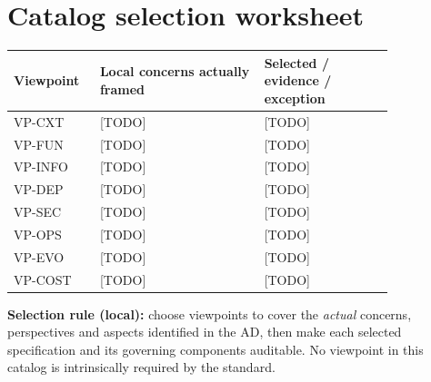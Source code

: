 \documentclass[11pt,letterpaper]{article}
\begin{document}
\section{Catalog selection worksheet}
\begin{longtable}{p{0.15\linewidth}p{0.38\linewidth}p{0.30\linewidth}}\toprule\textbf{Viewpoint}&\textbf{Local concerns actually framed}&\textbf{Selected / evidence / exception}\\\midrule\endhead
VP-CXT&[TODO]&[TODO]\\ VP-FUN&[TODO]&[TODO]\\ VP-INFO&[TODO]&[TODO]\\ VP-DEP&[TODO]&[TODO]\\ VP-SEC&[TODO]&[TODO]\\ VP-OPS&[TODO]&[TODO]\\ VP-EVO&[TODO]&[TODO]\\ VP-COST&[TODO]&[TODO]\\\bottomrule\end{longtable}
\textbf{Selection rule (local):} choose viewpoints to cover the \emph{actual} concerns, perspectives and aspects identified in the AD, then make each selected specification and its governing components auditable. No viewpoint in this catalog is intrinsically required by the standard.
\LegalFooter
\end{document}

